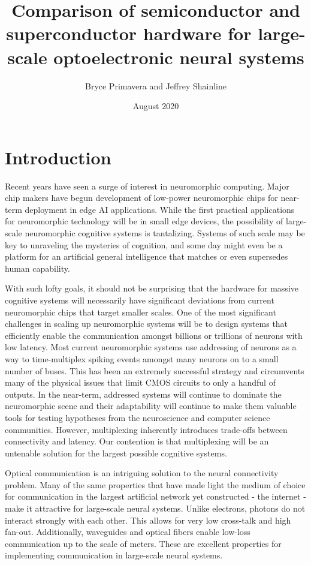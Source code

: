 \documentclass{article}
\title{Comparison of semiconductor and superconductor hardware for large-scale optoelectronic neural systems}
\author{Bryce Primavera and Jeffrey Shainline}
\date{August 2020}
\begin{document}
\maketitle
\begin{abstract}
\end{abstract}

\section{Introduction}

\quad \quad Recent years have seen a surge of interest in neuromorphic computing. Major chip makers have begun development of low-power neuromorphic chips for near-term deployment in edge AI applications.\cite{merolla2014million, davies2018loihi} While the first practical applications for neuromorphic technology will be in small edge devices, the possibility of large-scale neuromorphic cognitive systems is tantalizing. Systems of such scale may be key to unraveling the mysteries of cognition, and some day might even be a platform for an artificial general intelligence that matches or even supersedes human capability.

With such lofty goals, it should not be surprising that the hardware for massive cognitive systems will necessarily have significant deviations from current neuromorphic chips that target smaller scales. One of the most significant challenges in scaling up neuromorphic systems will be to design systems that efficiently enable the communication amongst billions or trillions of neurons with low latency. Most current neuromorphic systems use addressing of neurons as a way to time-multiplex spiking events amongst many neurons on to a small number of buses. This has been an extremely successful strategy and circumvents many of the physical issues that limit CMOS circuits to only a handful of outputs. In the near-term, addressed systems will continue to dominate the neuromorphic scene and their adaptability will continue to make them valuable tools for testing hypotheses from the neuroscience and computer science communities. However, multiplexing inherently introduces trade-offs between connectivity and latency. Our contention is that multiplexing will be an untenable solution for the largest possible cognitive systems.

Optical communication is an intriguing solution to the neural connectivity problem. Many of the same properties that have made light the medium of choice for communication in the largest artificial network yet constructed - the internet - make it attractive for large-scale neural systems. Unlike electrons, photons do not interact strongly with each other. This allows for very low cross-talk and high fan-out. Additionally, waveguides and optical fibers enable low-loss communication up to the scale of meters. These are excellent properties for implementing communication in large-scale neural systems. 
\end{document}
